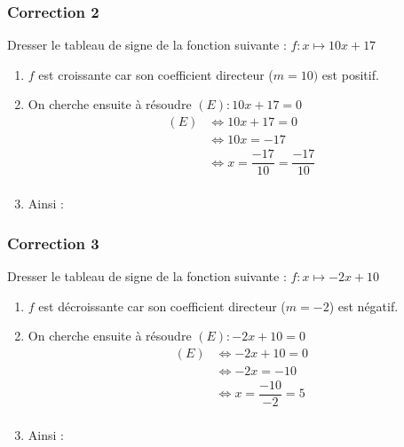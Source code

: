 \documentclass[15pt, mathserif]{beamer}
\begin{document}
\begin{frame}
\vspace{-10mm}
	\frametitle{Correction 2}
\vspace*{1cm} 
 \footnotesize{Dresser le tableau de signe de la fonction suivante : $ f:x\mapsto10x+17$} 
 \begin{enumerate} 
 \item $f$ est croissante car son coefficient directeur ($m=10)$ est positif.
 \item On cherche ensuite à résoudre  $(E) : 10x+17=0 $	 
 \begin{align*} (E)& \Leftrightarrow 10x+17=0\\
		 	 & \Leftrightarrow 10x=-17\\
			 & \Leftrightarrow x= \dfrac{-17}{10}=\dfrac{-17}{10}\\
	 \end{align*} 
 \item Ainsi : \\ 
 \end{enumerate} 
 \end{frame}


\begin{frame}
\vspace{-10mm}
	\frametitle{Correction 3}
\vspace*{1cm} 
 \footnotesize{Dresser le tableau de signe de la fonction suivante : $ f:x\mapsto-2x+10$} 
 \begin{enumerate} 
 \item $f$ est décroissante car son coefficient directeur ($m=-2$) est négatif.
 \item On cherche ensuite à résoudre  $(E) : -2x+10=0 $	 
 \begin{align*} (E)& \Leftrightarrow -2x+10=0\\
		 	 & \Leftrightarrow -2x=-10\\
			 & \Leftrightarrow x= \dfrac{-10}{-2}=5\\
	 \end{align*} 
 \item Ainsi : \\ 
 \end{enumerate} 
 \end{frame}
\end{document}
